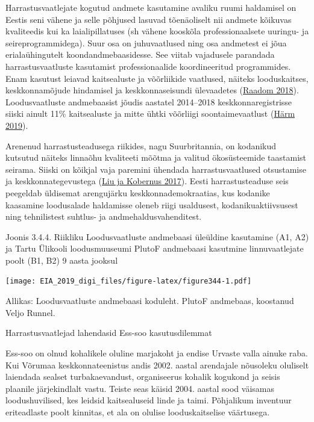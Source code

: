 \documentclass[estonian,]{article}
\begin{document}
Harrastusvaatlejate kogutud andmete kasutamine avaliku ruumi haldamisel on Eestis seni vähene ja selle põhjused lasuvad tõenäoliselt nii andmete kõikuvas kvaliteedis kui ka laialipillatuses (sh vähene kooskõla professionaalsete uuringu- ja seireprogrammidega). Suur osa on juhuvaatlused ning osa andmetest ei jõua erialaühingutelt koondandmebaasidesse. See viitab vajadusele parandada harrastusvaatluste kasutamist professionaalide koordineeritud programmides. Enam kasutust leiavad kaitsealuste ja võõrliikide vaatlused, näiteks looduskaitses, keskkonnamõjude hindamisel ja keskkonnaseisundi ülevaadetes (\protect\hyperlink{Raadom2018}{Raadom 2018}). Loodusvaatluste andmebaasist jõudis aastatel 2014--2018 keskkonnaregistrisse siiski ainult 11\% kaitsealuste ja mitte ühtki võõrliigi soontaimevaatlust (\protect\hyperlink{Harm2019}{Härm 2019}).

Arenenud harrastusteadusega riikides, nagu Suurbritannia, on kodanikud kutsutud näiteks linnaõhu kvaliteeti mõõtma ja valitud ökosüsteemide taastamist seirama. Siiski on kõikjal vaja paremini ühendada harrastusvaatlused otsustamise ja keskkonnategevustega (\protect\hyperlink{Liu2017}{Liu ja Kobernus 2017}). Eesti harrastusteaduse seis peegeldab üldisemat arengujärku keskkonnademokraatias, kus kodanike kaasamine loodusalade haldamisse oleneb riigi usaldusest, kodanikuaktiivsusest ning tehnilistest suhtlus- ja andmehaldusvahenditest.

{Joonis 3.4.4.} Riikliku Loodusvaatluste andmebaasi üleüldine kasutamine (A1, A2) ja Tartu Ülikooli loodusmuuseumi PlutoF andmebaasi kasutmine linnuvaatlejate poolt (B1, B2) 9 aasta jooksul

\texttt{[image: EIA\_2019\_digi\_files/figure-latex/figure344-1.pdf]}

\begin{imgsource}
{Allikas:} Loodusvaatluste andmebaasi koduleht. PlutoF andmebaas,
koostanud Veljo Runnel.
\end{imgsource}

Harrastusvaatlejad lahendasid Ess-soo kasutusdilemmat

Ess-soo on olnud kohalikele oluline marjakoht ja endise Urvaste valla ainuke raba. Kui Võrumaa keskkonnateenistus andis 2002. aastal arendajale nõusoleku oluliselt laiendada sealset turbakaevandust, organiseerus kohalik kogukond ja seisis plaanile järjekindlalt vastu. Teiste seas käisid 2004. aastal sood väisamas loodushuvilised, kes leidsid kaitsealuseid linde ja taimi. Põhjalikum inventuur eriteadlaste poolt kinnitas, et ala on olulise looduskaitselise väärtusega.
\end{document}

